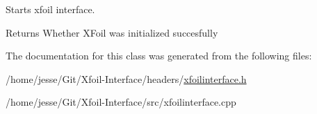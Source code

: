 Starts xfoil interface. 

\begin{DoxyReturn}{Returns}
Whether X\+Foil was initialized succesfully 
\end{DoxyReturn}


The documentation for this class was generated from the following files\+:\begin{DoxyCompactItemize}
\item 
/home/jesse/\+Git/\+Xfoil-\/\+Interface/headers/\hyperlink{xfoilinterface_8h}{xfoilinterface.\+h}\item 
/home/jesse/\+Git/\+Xfoil-\/\+Interface/src/xfoilinterface.\+cpp\end{DoxyCompactItemize}
